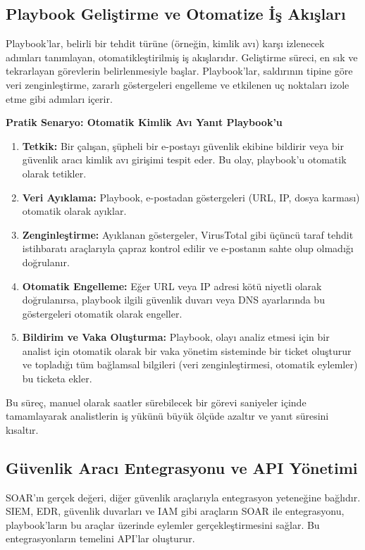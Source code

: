 \subsection{Playbook Geliştirme ve Otomatize İş Akışları}

Playbook'lar, belirli bir tehdit türüne (örneğin, kimlik avı) karşı izlenecek adımları tanımlayan, otomatikleştirilmiş iş akışlarıdır. Geliştirme süreci, en sık ve tekrarlayan görevlerin belirlenmesiyle başlar. Playbook'lar, saldırının tipine göre veri zenginleştirme, zararlı göstergeleri engelleme ve etkilenen uç noktaları izole etme gibi adımları içerir.

\textbf{Pratik Senaryo: Otomatik Kimlik Avı Yanıt Playbook'u}

\begin{enumerate}
    \item \textbf{Tetkik:} Bir çalışan, şüpheli bir e-postayı güvenlik ekibine bildirir veya bir güvenlik aracı kimlik avı girişimi tespit eder. Bu olay, playbook'u otomatik olarak tetikler.
    \item \textbf{Veri Ayıklama:} Playbook, e-postadan göstergeleri (URL, IP, dosya karması) otomatik olarak ayıklar.
    \item \textbf{Zenginleştirme:} Ayıklanan göstergeler, VirusTotal gibi üçüncü taraf tehdit istihbaratı araçlarıyla çapraz kontrol edilir ve e-postanın sahte olup olmadığı doğrulanır.
    \item \textbf{Otomatik Engelleme:} Eğer URL veya IP adresi kötü niyetli olarak doğrulanırsa, playbook ilgili güvenlik duvarı veya DNS ayarlarında bu göstergeleri otomatik olarak engeller.
    \item \textbf{Bildirim ve Vaka Oluşturma:} Playbook, olayı analiz etmesi için bir analist için otomatik olarak bir vaka yönetim sisteminde bir ticket oluşturur ve topladığı tüm bağlamsal bilgileri (veri zenginleştirmesi, otomatik eylemler) bu ticketa ekler.
\end{enumerate}

Bu süreç, manuel olarak saatler sürebilecek bir görevi saniyeler içinde tamamlayarak analistlerin iş yükünü büyük ölçüde azaltır ve yanıt süresini kısaltır.

\subsection{Güvenlik Aracı Entegrasyonu ve API Yönetimi}

SOAR'ın gerçek değeri, diğer güvenlik araçlarıyla entegrasyon yeteneğine bağlıdır. SIEM, EDR, güvenlik duvarları ve IAM gibi araçların SOAR ile entegrasyonu, playbook'ların bu araçlar üzerinde eylemler gerçekleştirmesini sağlar. Bu entegrasyonların temelini API'lar oluşturur.

